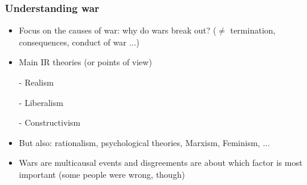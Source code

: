 \documentclass[aspectratio=43]{beamer}
\begin{document}
\begin{frame}
\frametitle{Understanding war}
\centering

\begin{itemize}[<+->]
\item Focus on the causes of war: why do wars break out? ($\neq$ termination, consequences, conduct of war ...)
\item Main IR theories (or points of view)
  \item[-] Realism
  \item[-] Liberalism
  \item[-] Constructivism
\item But also: rationalism, psychological theories, Marxism, Feminism, ...
\item Wars are multicausal events and disgreements are about which factor is most important (some people were wrong, though)
\end{itemize}

\end{frame}
\end{document}
